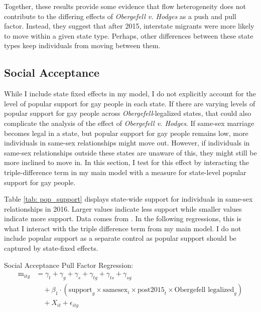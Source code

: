 \documentclass[12pt,letterpaper]{article}
\begin{document}
Together, these results provide some evidence that flow heterogeneity does not contribute to the differing effects of \textit{Obergefell v. Hodges} as a push and pull factor. Instead, they suggest that after 2015, interstate migrants were more likely to move within a given state type. Perhaps, other differences between these state types keep individuals from moving between them.

\FloatBarrier
\subsection{Social Acceptance}

While I include state fixed effects in my model, I do not explicitly account for the level of popular support for gay people in each state. If there are varying levels of popular support for gay people across \textit{Obergefell}-legalized states, that could also complicate the analysis of the effect of \textit{Obergefell v. Hodges}. If same-sex marriage becomes legal in a state, but popular support for gay people remains low, more individuals in same-sex relationships might move out. However, if individuals in same-sex relationships outside these states are unaware of this, they might still be more inclined to move in. In this section, I test for this effect by interacting the triple-difference term in my main model with a measure for state-level popular support for gay people.



Table \ref{tab: pop_support} displays state-wide support for individuals in same-sex relationships in 2016. Larger values indicate less support while smaller values indicate more support. Data comes from \citet{29}. In the following regressions, this is what I interact with the triple difference term from my main model. I do not include popular support as a separate control as popular support should be captured by state-fixed effects.

\hfill
\break
Social Acceptance Pull Factor Regression:
\begin{equation}
\begin{aligned}
\text{m}_{itg} &= \gamma_t + \gamma_g + \gamma_s + \gamma_{tg} + \gamma_{ts} + \gamma_{sg} \\
&\quad + \beta_1 \cdot (\text{support}_g \times \text{samesex}_i \times \text{post2015}_t \times \text{Obergefell legalized}_g) \\
&\quad + X_{it} + \epsilon_{itg}
\end{aligned}
\end{equation}
\end{document}
